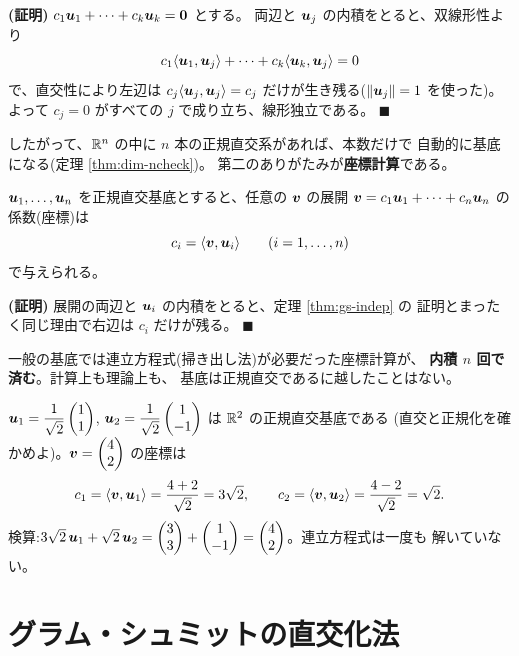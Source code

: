 \noindent\textbf{(証明)}\quad
$c_1\bm{u}_1 + \cdots + c_k\bm{u}_k = \bm{0}$ とする。
両辺と $\bm{u}_j$ の内積をとると、双線形性より
\[
c_1\langle \bm{u}_1, \bm{u}_j \rangle + \cdots
+ c_k\langle \bm{u}_k, \bm{u}_j \rangle = 0
\]
で、直交性により左辺は $c_j\langle \bm{u}_j, \bm{u}_j \rangle = c_j$
だけが生き残る($\|\bm{u}_j\| = 1$ を使った)。よって
$c_j = 0$ がすべての $j$ で成り立ち、線形独立である。 $\blacksquare$

したがって、$\mathbb{R}^n$ の中に $n$ 本の正規直交系があれば、本数だけで
自動的に基底になる(定理 \ref{thm:dim-ncheck})。
第二のありがたみが\textbf{座標計算}である。

\begin{teiri}[座標は内積で求まる]\label{thm:gs-coord}
$\bm{u}_1, \dots, \bm{u}_n$ を正規直交基底とすると、任意の
$\bm{v}$ の展開 $\bm{v} = c_1\bm{u}_1 + \cdots + c_n\bm{u}_n$ の
係数(座標)は
\[
c_i = \langle \bm{v}, \bm{u}_i \rangle \qquad (i = 1, \dots, n)
\]
で与えられる。
\end{teiri}

\noindent\textbf{(証明)}\quad
展開の両辺と $\bm{u}_i$ の内積をとると、定理 \ref{thm:gs-indep} の
証明とまったく同じ理由で右辺は $c_i$ だけが残る。 $\blacksquare$

一般の基底では連立方程式(掃き出し法)が必要だった座標計算が、
\textbf{内積 $n$ 回で済む}。計算上も理論上も、
基底は正規直交であるに越したことはない。

\begin{rei}[座標の即読]\label{rei:gs-coordread}
$\bm{u}_1 = \dfrac{1}{\sqrt{2}}\begin{pmatrix}1 \\ 1\end{pmatrix}$,
$\bm{u}_2 = \dfrac{1}{\sqrt{2}}\begin{pmatrix}1 \\ -1\end{pmatrix}$ は $\mathbb{R}^2$ の正規直交基底である
(直交と正規化を確かめよ)。$\bm{v} = \begin{pmatrix}4 \\ 2\end{pmatrix}$ の座標は
\[
c_1 = \langle \bm{v}, \bm{u}_1 \rangle = \frac{4 + 2}{\sqrt{2}} = 3\sqrt{2},
\qquad
c_2 = \langle \bm{v}, \bm{u}_2 \rangle = \frac{4 - 2}{\sqrt{2}} = \sqrt{2}.
\]
検算:$3\sqrt{2}\,\bm{u}_1 + \sqrt{2}\,\bm{u}_2
= \begin{pmatrix}3 \\ 3\end{pmatrix} + \begin{pmatrix}1 \\ -1\end{pmatrix} = \begin{pmatrix}4 \\ 2\end{pmatrix}$。連立方程式は一度も
解いていない。
\end{rei}

\section{グラム・シュミットの直交化法}

